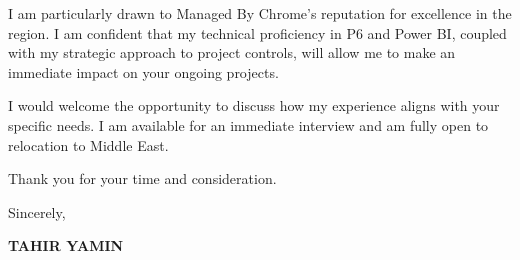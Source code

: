 \documentclass[11pt,a4paper]{article}
\begin{document}
I am particularly drawn to Managed By Chrome's reputation for excellence in the region. I am confident that my technical proficiency in P6 and Power BI, coupled with my strategic approach to project controls, will allow me to make an immediate impact on your ongoing projects.

I would welcome the opportunity to discuss how my experience aligns with your specific needs. I am available for an immediate interview and am fully open to relocation to Middle East.

Thank you for your time and consideration.

\vspace{0.5cm}
Sincerely,

\vspace{0.5cm}
\textbf{TAHIR YAMIN}
\end{document}
